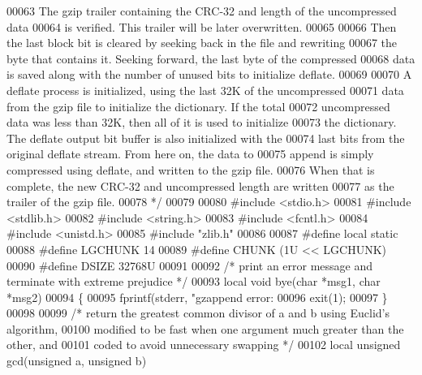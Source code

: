 \begin{DoxyCode}
00063 \textcolor{comment}{   The gzip trailer containing the CRC-32 and length of the uncompressed data}
00064 \textcolor{comment}{   is verified.  This trailer will be later overwritten.}
00065 \textcolor{comment}{}
00066 \textcolor{comment}{   Then the last block bit is cleared by seeking back in the file and rewriting}
00067 \textcolor{comment}{   the byte that contains it.  Seeking forward, the last byte of the compressed}
00068 \textcolor{comment}{   data is saved along with the number of unused bits to initialize deflate.}
00069 \textcolor{comment}{}
00070 \textcolor{comment}{   A deflate process is initialized, using the last 32K of the uncompressed}
00071 \textcolor{comment}{   data from the gzip file to initialize the dictionary.  If the total}
00072 \textcolor{comment}{   uncompressed data was less than 32K, then all of it is used to initialize}
00073 \textcolor{comment}{   the dictionary.  The deflate output bit buffer is also initialized with the}
00074 \textcolor{comment}{   last bits from the original deflate stream.  From here on, the data to}
00075 \textcolor{comment}{   append is simply compressed using deflate, and written to the gzip file.}
00076 \textcolor{comment}{   When that is complete, the new CRC-32 and uncompressed length are written}
00077 \textcolor{comment}{   as the trailer of the gzip file.}
00078 \textcolor{comment}{ */}
00079 
00080 \textcolor{preprocessor}{#include <stdio.h>}
00081 \textcolor{preprocessor}{#include <stdlib.h>}
00082 \textcolor{preprocessor}{#include <string.h>}
00083 \textcolor{preprocessor}{#include <fcntl.h>}
00084 \textcolor{preprocessor}{#include <unistd.h>}
00085 \textcolor{preprocessor}{#include "zlib.h"}
00086 
00087 \textcolor{preprocessor}{#define local static}
00088 \textcolor{preprocessor}{#define LGCHUNK 14}
00089 \textcolor{preprocessor}{#define CHUNK (1U << LGCHUNK)}
00090 \textcolor{preprocessor}{#define DSIZE 32768U}
00091 
00092 \textcolor{comment}{/* print an error message and terminate with extreme prejudice */}
00093 local \textcolor{keywordtype}{void} bye(\textcolor{keywordtype}{char} *msg1, \textcolor{keywordtype}{char} *msg2)
00094 \{
00095     fprintf(stderr, \textcolor{stringliteral}{"gzappend error: %
00096     exit(1);
00097 \}
00098 
00099 \textcolor{comment}{/* return the greatest common divisor of a and b using Euclid's algorithm,}
00100 \textcolor{comment}{   modified to be fast when one argument much greater than the other, and}
00101 \textcolor{comment}{   coded to avoid unnecessary swapping */}
00102 local \textcolor{keywordtype}{unsigned} gcd(\textcolor{keywordtype}{unsigned} a, \textcolor{keywordtype}{unsigned} b)
}
\end{DoxyCode}
